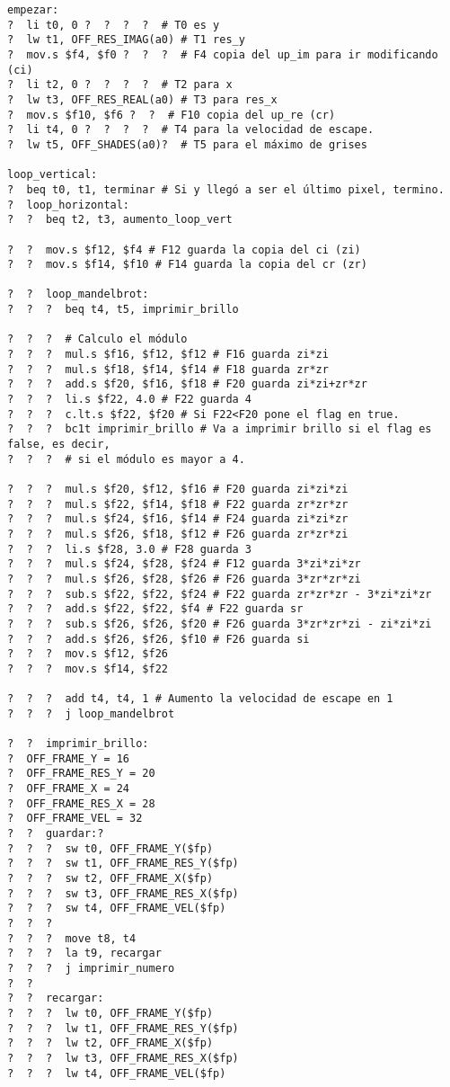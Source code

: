 \documentclass[a4paper,10pt]{article}
\begin{document}
\begin{verbatim}
empezar:
?  li t0, 0 ?  ?  ?  ?  # T0 es y
?  lw t1, OFF_RES_IMAG(a0) # T1 res_y
?  mov.s $f4, $f0 ?  ?  ?  # F4 copia del up_im para ir modificando (ci)
?  li t2, 0 ?  ?  ?  ?  # T2 para x
?  lw t3, OFF_RES_REAL(a0) # T3 para res_x
?  mov.s $f10, $f6 ?  ?  # F10 copia del up_re (cr)
?  li t4, 0 ?  ?  ?  ?  # T4 para la velocidad de escape.
?  lw t5, OFF_SHADES(a0)?  # T5 para el máximo de grises

loop_vertical:
?  beq t0, t1, terminar # Si y llegó a ser el último pixel, termino.
?  loop_horizontal:
?  ?  beq t2, t3, aumento_loop_vert

?  ?  mov.s $f12, $f4 # F12 guarda la copia del ci (zi)
?  ?  mov.s $f14, $f10 # F14 guarda la copia del cr (zr)

?  ?  loop_mandelbrot:
?  ?  ?  beq t4, t5, imprimir_brillo

?  ?  ?  # Calculo el módulo
?  ?  ?  mul.s $f16, $f12, $f12 # F16 guarda zi*zi
?  ?  ?  mul.s $f18, $f14, $f14 # F18 guarda zr*zr
?  ?  ?  add.s $f20, $f16, $f18 # F20 guarda zi*zi+zr*zr
?  ?  ?  li.s $f22, 4.0 # F22 guarda 4
?  ?  ?  c.lt.s $f22, $f20 # Si F22<F20 pone el flag en true.
?  ?  ?  bc1t imprimir_brillo # Va a imprimir brillo si el flag es false, es decir,
?  ?  ?  # si el módulo es mayor a 4.

?  ?  ?  mul.s $f20, $f12, $f16 # F20 guarda zi*zi*zi
?  ?  ?  mul.s $f22, $f14, $f18 # F22 guarda zr*zr*zr
?  ?  ?  mul.s $f24, $f16, $f14 # F24 guarda zi*zi*zr
?  ?  ?  mul.s $f26, $f18, $f12 # F26 guarda zr*zr*zi
?  ?  ?  li.s $f28, 3.0 # F28 guarda 3
?  ?  ?  mul.s $f24, $f28, $f24 # F12 guarda 3*zi*zi*zr
?  ?  ?  mul.s $f26, $f28, $f26 # F26 guarda 3*zr*zr*zi
?  ?  ?  sub.s $f22, $f22, $f24 # F22 guarda zr*zr*zr - 3*zi*zi*zr
?  ?  ?  add.s $f22, $f22, $f4 # F22 guarda sr
?  ?  ?  sub.s $f26, $f26, $f20 # F26 guarda 3*zr*zr*zi - zi*zi*zi
?  ?  ?  add.s $f26, $f26, $f10 # F26 guarda si
?  ?  ?  mov.s $f12, $f26
?  ?  ?  mov.s $f14, $f22

?  ?  ?  add t4, t4, 1 # Aumento la velocidad de escape en 1
?  ?  ?  j loop_mandelbrot

?  ?  imprimir_brillo:
?  OFF_FRAME_Y = 16
?  OFF_FRAME_RES_Y = 20
?  OFF_FRAME_X = 24
?  OFF_FRAME_RES_X = 28
?  OFF_FRAME_VEL = 32
?  ?  guardar:?  
?  ?  ?  sw t0, OFF_FRAME_Y($fp)
?  ?  ?  sw t1, OFF_FRAME_RES_Y($fp)
?  ?  ?  sw t2, OFF_FRAME_X($fp)
?  ?  ?  sw t3, OFF_FRAME_RES_X($fp)
?  ?  ?  sw t4, OFF_FRAME_VEL($fp)
?  ?  ?  
?  ?  ?  move t8, t4
?  ?  ?  la t9, recargar
?  ?  ?  j imprimir_numero
?  ?  
?  ?  recargar:
?  ?  ?  lw t0, OFF_FRAME_Y($fp)
?  ?  ?  lw t1, OFF_FRAME_RES_Y($fp)
?  ?  ?  lw t2, OFF_FRAME_X($fp)
?  ?  ?  lw t3, OFF_FRAME_RES_X($fp)
?  ?  ?  lw t4, OFF_FRAME_VEL($fp)


\end{verbatim}
\end{document}
